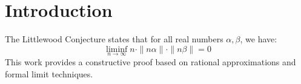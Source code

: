 
\section{Introduction}
The Littlewood Conjecture states that for all real numbers \( \alpha, \beta \), we have:
\[
\liminf_{n \to \infty} n \cdot \|n\alpha\| \cdot \|n\beta\| = 0
\]
This work provides a constructive proof based on rational approximations and formal limit techniques.
